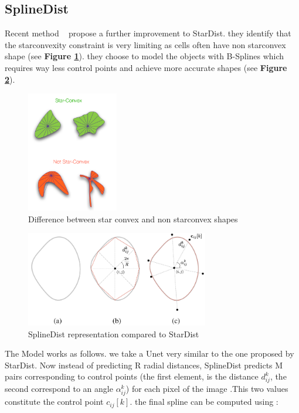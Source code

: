 \documentclass[main.tex]{subfiles}
\begin{document}
\subsection{SplineDist}
Recent method ~\cite{Mandal2020} propose a further improvement to StarDist. they identify that the starconvexity constraint is very limiting as cells often have non starconvex shape (see \textbf{Figure \ref{fig:starxonvex}}). they choose to model the objects with B-Splines which requires way less control points and achieve more accurate shapes (see \textbf{Figure \ref{fig:splineangles}}).

\begin{figure}[H]
    \centering
    \includegraphics[width=4cm]{images/starconvex.png}
    \caption{Difference between star convex and non starconvex shapes}
    \label{fig:starxonvex}
\end{figure}

\begin{figure}[H]
    \centering
    \includegraphics[width=8cm]{images/splinevsstarangles.png}
    \caption{SplineDist representation compared to StarDist}
    \label{fig:splineangles}
\end{figure}

The Model works as follows. we take a Unet very similar to the one proposed by StarDist. Now instead of predicting R radial distances, SplineDist predicts M pairs corresponding to control points (the first element, is the distance $d_{ij}^{k}$, the second correspond to an angle $\alpha_{ij}^{k}$) for each pixel of the image .This two values constitute the control point $c_{ij}[k]$. the final spline can be computed using :
\end{document}
